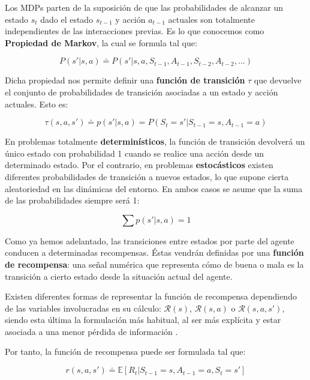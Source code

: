 Los MDPs parten de la suposición de que las probabilidades de alcanzar un estado $s_t$ dado el estado $s_{t-1}$ y acción $a_{t-1}$ actuales son totalmente independientes de las interacciones previas. Es lo que conocemos como \textbf{Propiedad de Markov}, la cual se formula tal que:

\begin{equation}
    P(s'|s,a) \doteq P(s'|s, a, S_{t-1}, A_{t-1}, S_{t-2}, A_{t-2}, ...)
\end{equation}

Dicha propiedad nos permite definir una \textbf{función de transición} $\tau$ que devuelve el conjunto de probabilidades de transición asociadas a un estado y acción actuales. Esto es:

\begin{equation}
    \tau(s,a,s') \doteq p(s'|s,a) = P(S_t = s'|S_{t-1} = s, A_{t-1} = a)
\end{equation}

En problemas totalmente \textbf{determinísticos}, la función de transición devolverá un único estado con probabilidad 1 cuando se realice una acción desde un determinado estado. Por el contrario, en problemas \textbf{estocásticos} existen diferentes probabilidades de transición a nuevos estados, lo que supone cierta aleatoriedad en las dinámicas del entorno. En ambos casos se asume que la suma de las probabilidades siempre será 1:

\begin{equation}
    \sum p(s'|s,a) = 1
\end{equation}

Como ya hemos adelantado, las transiciones entre estados por parte del agente conducen a determinadas recompensas. Éstas vendrán definidas por una \textbf{función de recompensa}: una señal numérica que representa cómo de buena o mala es la transición a cierto estado desde la situación actual del agente.

Existen diferentes formas de representar la función de recompensa dependiendo de las variables involucradas en su cálculo: $\mathcal{R}(s)$, $\mathcal{R}(s,a)$ o $\mathcal{R}(s,a,s')$, siendo esta última la formulación más habitual, al ser más explícita y estar asociada a una menor pérdida de información \cite{morales2020grokking}.

Por tanto, la función de recompensa puede ser formulada tal que:

\begin{equation}
     r(s,a,s') \doteq \mathds{E}[R_t|S_{t-1} = s, A_{t-1} = a, S_t = s']
\end{equation}

